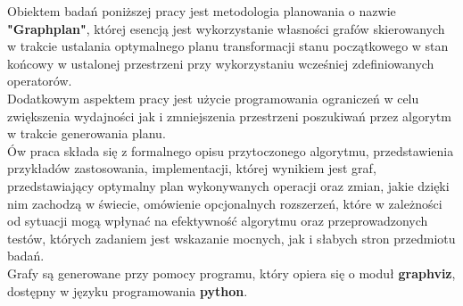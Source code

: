 \begin{streszczenie}
Obiektem badań poniższej pracy jest metodologia planowania
o nazwie \textbf{"Graphplan"}, której esencją jest wykorzystanie
własności grafów skierowanych w trakcie ustalania optymalnego planu transformacji
stanu początkowego w stan końcowy w ustalonej przestrzeni przy wykorzystaniu wcześniej zdefiniowanych
operatorów. \\
Dodatkowym aspektem pracy jest użycie programowania ograniczeń w celu zwiększenia wydajności jak i zmniejszenia
przestrzeni poszukiwań przez algorytm w trakcie generowania planu. \\
Ów praca składa się z formalnego opisu przytoczonego algorytmu, przedstawienia przykładów zastosowania,
implementacji, której wynikiem jest graf, przedstawiający optymalny plan wykonywanych operacji oraz zmian, jakie dzięki nim zachodzą w świecie,
omówienie opcjonalnych rozszerzeń, które w zależności od sytuacji mogą wpłynać na efektywność algorytmu
oraz przeprowadzonych testów, których zadaniem jest wskazanie mocnych, jak i słabych stron przedmiotu badań. \\
Grafy są generowane przy pomocy programu, który opiera się o moduł \textbf{graphviz}, dostępny w języku programowania \textbf{python}.

\end{streszczenie}
